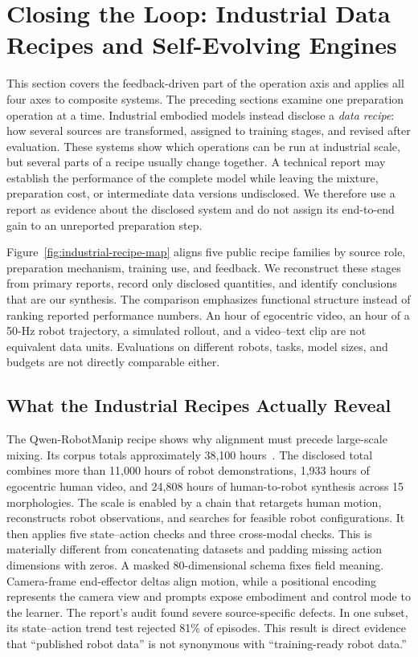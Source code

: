 \section{Closing the Loop: Industrial Data Recipes and Self-Evolving Engines}
\label{sec:recipes-engines}

This section covers the feedback-driven part of the operation axis and applies all four axes to composite systems.
The preceding sections examine one preparation operation at a time.
Industrial embodied models instead disclose a \emph{data recipe}: how several sources are transformed, assigned to training stages, and revised after evaluation.
These systems show which operations can be run at industrial scale, but several parts of a recipe usually change together.
A technical report may establish the performance of the complete model while leaving the mixture, preparation cost, or intermediate data versions undisclosed.
We therefore use a report as evidence about the disclosed system and do not assign its end-to-end gain to an unreported preparation step.

Figure~\ref{fig:industrial-recipe-map} aligns five public recipe families by source role, preparation mechanism, training use, and feedback.
We reconstruct these stages from primary reports, record only disclosed quantities, and identify conclusions that are our synthesis.
The comparison emphasizes functional structure instead of ranking reported performance numbers.
An hour of egocentric video, an hour of a 50-Hz robot trajectory, a simulated rollout, and a video--text clip are not equivalent data units.
Evaluations on different robots, tasks, model sizes, and budgets are not directly comparable either.



\subsection{What the Industrial Recipes Actually Reveal}

The Qwen-RobotManip recipe shows why alignment must precede large-scale mixing.
Its corpus totals approximately 38,100 hours~\cite{yuan2026qwen_2606_17846}.
The disclosed total combines more than 11,000 hours of robot demonstrations, 1,933 hours of egocentric human video, and 24,808 hours of human-to-robot synthesis across 15 morphologies.
The scale is enabled by a chain that retargets human motion, reconstructs robot observations, and searches for feasible robot configurations.
It then applies five state--action checks and three cross-modal checks.
This is materially different from concatenating datasets and padding missing action dimensions with zeros.
A masked 80-dimensional schema fixes field meaning.
Camera-frame end-effector deltas align motion, while a positional encoding represents the camera view and prompts expose embodiment and control mode to the learner.
The report's audit found severe source-specific defects.
In one subset, its state--action trend test rejected 81\% of episodes.
This result is direct evidence that ``published robot data'' is not synonymous with ``training-ready robot data.''

